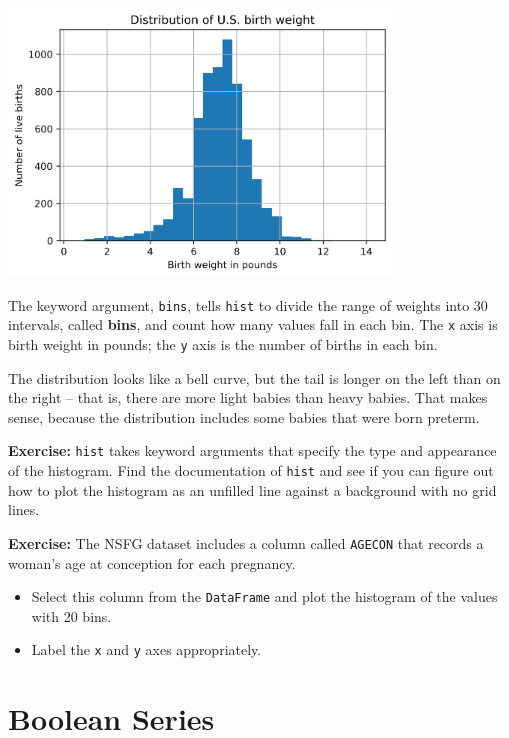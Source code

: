 \begin{center}
\includegraphics[width=4in]{chapters/07_dataframes_files/07_dataframes_60_0.png}
\end{center}

The keyword argument, \passthrough{\lstinline!bins!}, tells
\passthrough{\lstinline!hist!} to divide the range of weights into 30
intervals, called \textbf{bins}, and count how many values fall in each
bin. The \passthrough{\lstinline!x!} axis is birth weight in pounds; the
\passthrough{\lstinline!y!} axis is the number of births in each bin.

The distribution looks like a bell curve, but the tail is longer on the
left than on the right -- that is, there are more light babies than
heavy babies. That makes sense, because the distribution includes some
babies that were born preterm.

\textbf{Exercise:} \passthrough{\lstinline!hist!} takes keyword
arguments that specify the type and appearance of the histogram. Find
the documentation of \passthrough{\lstinline!hist!} and see if you can
figure out how to plot the histogram as an unfilled line against a
background with no grid lines.

\textbf{Exercise:} The NSFG dataset includes a column called
\passthrough{\lstinline!AGECON!} that records a woman's age at
conception for each pregnancy.

\begin{itemize}
\item
  Select this column from the \passthrough{\lstinline!DataFrame!} and
  plot the histogram of the values with 20 bins.
\item
  Label the \passthrough{\lstinline!x!} and \passthrough{\lstinline!y!}
  axes appropriately.
\end{itemize}

\hypertarget{boolean-series}{%
\section{Boolean Series}\label{boolean-series}}

